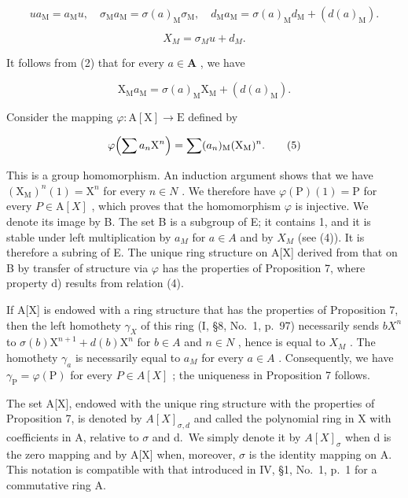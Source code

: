\[
u a _ {\mathrm{M}} = a _ {\mathrm{M}} u, \quad \sigma_ {\mathrm{M}} a _ {\mathrm{M}} = \sigma (a) _ {\mathrm{M}} \sigma_ {\mathrm{M}}, \quad d _ {\mathrm{M}} a _ {\mathrm{M}} = \sigma (a) _ {\mathrm{M}} d _ {\mathrm{M}} + (d (a) _ {\mathrm{M}}).\tag{2}
\]

\[
X_ {M} = \sigma_ {M} u+ d_ {M} .\tag{3}
\]

It follows from (2) that for every \(a \in \mathbf{A}\) , we have

\[
\mathrm{X} _ {\mathrm{M}} a _ {\mathrm{M}} = \sigma (a) _ {\mathrm{M}} \mathrm{X} _ {\mathrm{M}} + (d (a) _ {\mathrm{M}}).\tag{4}
\]

Consider the mapping \(\varphi : \mathrm{A}[\mathrm{X}] \to \mathrm{E}\) defined by

\[
\varphi \Bigl (\sum a _ {n} \mathrm{X} ^ {n} \Bigr) = \sum (a _ {n}) _ {\mathrm{M}} (\mathrm{X} _ {\mathrm{M}}) ^ {n}.\tag{5}
\]

This is a group homomorphism. An induction argument shows that we have \((\mathrm{X}_{\mathrm{M}})^{n}(1)=\mathrm{X}^{n}\) for every \(n\in N\) . We therefore have \(\varphi(\mathrm{P})(1)=\mathrm{P}\) for every \(P\in\mathrm{A}[X]\) , which proves that the homomorphism \(\varphi\) is injective. We denote its image by B. The set B is a subgroup of E; it contains 1, and it is stable under left multiplication by \(a_{M}\) for \(a\in A\) and by \(X_{M}\) (see (4)). It is therefore a subring of E. The unique ring structure on A{[}X{]} derived from that on B by transfer of structure via \(\varphi\) has the properties of Proposition 7, where property d) results from relation (4).

If A{[}X{]} is endowed with a ring structure that has the properties of Proposition 7, then the left homothety \(\gamma_{X}\) of this ring (I, §8, No.~1, p.~97) necessarily sends \(bX^{n}\) to \(\sigma(b)\mathrm{X}^{n+1} + d(b)\mathrm{X}^{n}\) for \(b \in A\) and \(n \in N\) , hence is equal to \(X_{M}\) . The homothety \(\gamma_{a}\) is necessarily equal to \(a_{M}\) for every \(a \in A\) . Consequently, we have \(\gamma_{\mathrm{P}} = \varphi(\mathrm{P})\) for every \(P \in A[X]\) ; the uniqueness in Proposition 7 follows.

The set A{[}X{]}, endowed with the unique ring structure with the properties of Proposition 7, is denoted by \(A[X]_{\sigma,d}\) and called the polynomial ring in X with coefficients in A, relative to \(\sigma\) and d.~We simply denote it by \(A[X]_{\sigma}\) when d is the zero mapping and by A{[}X{]} when, moreover, \(\sigma\) is the identity mapping on A. This notation is compatible with that introduced in IV, §1, No.~1, p.~1 for a commutative ring A.

